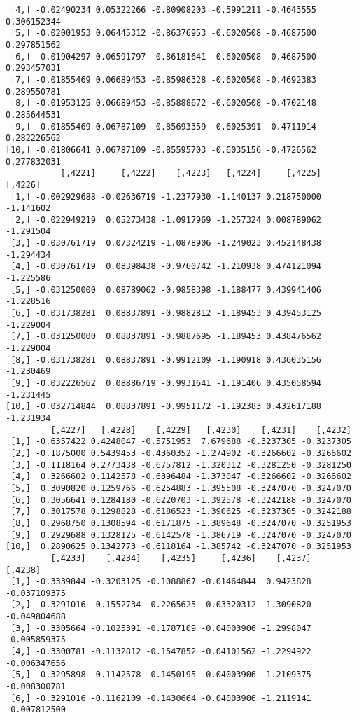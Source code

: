 \documentclass[
  letterpaper,
  DIV=11,
  numbers=noendperiod]{scrreprt}
\begin{document}
\begin{verbatim}
 [4,] -0.02490234 0.05322266 -0.80908203 -0.5991211 -0.4643555 0.306152344
 [5,] -0.02001953 0.06445312 -0.86376953 -0.6020508 -0.4687500 0.297851562
 [6,] -0.01904297 0.06591797 -0.86181641 -0.6020508 -0.4687500 0.293457031
 [7,] -0.01855469 0.06689453 -0.85986328 -0.6020508 -0.4692383 0.289550781
 [8,] -0.01953125 0.06689453 -0.85888672 -0.6020508 -0.4702148 0.285644531
 [9,] -0.01855469 0.06787109 -0.85693359 -0.6025391 -0.4711914 0.282226562
[10,] -0.01806641 0.06787109 -0.85595703 -0.6035156 -0.4726562 0.277832031
           [,4221]     [,4222]    [,4223]   [,4224]     [,4225]   [,4226]
 [1,] -0.002929688 -0.02636719 -1.2377930 -1.140137 0.218750000 -1.141602
 [2,] -0.022949219  0.05273438 -1.0917969 -1.257324 0.008789062 -1.291504
 [3,] -0.030761719  0.07324219 -1.0878906 -1.249023 0.452148438 -1.294434
 [4,] -0.030761719  0.08398438 -0.9760742 -1.210938 0.474121094 -1.225586
 [5,] -0.031250000  0.08789062 -0.9858398 -1.188477 0.439941406 -1.228516
 [6,] -0.031738281  0.08837891 -0.9882812 -1.189453 0.439453125 -1.229004
 [7,] -0.031250000  0.08837891 -0.9887695 -1.189453 0.438476562 -1.229004
 [8,] -0.031738281  0.08837891 -0.9912109 -1.190918 0.436035156 -1.230469
 [9,] -0.032226562  0.08886719 -0.9931641 -1.191406 0.435058594 -1.231445
[10,] -0.032714844  0.08837891 -0.9951172 -1.192383 0.432617188 -1.231934
         [,4227]   [,4228]    [,4229]   [,4230]    [,4231]    [,4232]
 [1,] -0.6357422 0.4248047 -0.5751953  7.679688 -0.3237305 -0.3237305
 [2,] -0.1875000 0.5439453 -0.4360352 -1.274902 -0.3266602 -0.3266602
 [3,] -0.1118164 0.2773438 -0.6757812 -1.320312 -0.3281250 -0.3281250
 [4,]  0.3266602 0.1142578 -0.6396484 -1.373047 -0.3266602 -0.3266602
 [5,]  0.3090820 0.1259766 -0.6254883 -1.395508 -0.3247070 -0.3247070
 [6,]  0.3056641 0.1284180 -0.6220703 -1.392578 -0.3242188 -0.3247070
 [7,]  0.3017578 0.1298828 -0.6186523 -1.390625 -0.3237305 -0.3242188
 [8,]  0.2968750 0.1308594 -0.6171875 -1.389648 -0.3247070 -0.3251953
 [9,]  0.2929688 0.1328125 -0.6142578 -1.386719 -0.3247070 -0.3247070
[10,]  0.2890625 0.1342773 -0.6118164 -1.385742 -0.3247070 -0.3251953
         [,4233]    [,4234]    [,4235]     [,4236]    [,4237]      [,4238]
 [1,] -0.3339844 -0.3203125 -0.1088867 -0.01464844  0.9423828 -0.037109375
 [2,] -0.3291016 -0.1552734 -0.2265625 -0.03320312 -1.3090820 -0.049804688
 [3,] -0.3305664 -0.1025391 -0.1787109 -0.04003906 -1.2998047 -0.005859375
 [4,] -0.3300781 -0.1132812 -0.1547852 -0.04101562 -1.2294922 -0.006347656
 [5,] -0.3295898 -0.1142578 -0.1450195 -0.04003906 -1.2109375 -0.008300781
 [6,] -0.3291016 -0.1162109 -0.1430664 -0.04003906 -1.2119141 -0.007812500

\end{verbatim}
\end{document}

